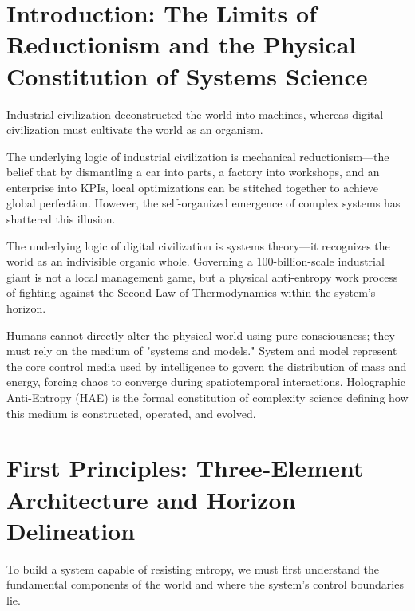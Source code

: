 \documentclass[11pt,a4paper]{article}
\begin{document}
\newpage

\section{Introduction: The Limits of Reductionism and the Physical Constitution of Systems Science}

Industrial civilization deconstructed the world into machines, whereas digital civilization must cultivate the world as an organism.

The underlying logic of industrial civilization is mechanical reductionism—the belief that by dismantling a car into parts, a factory into workshops, and an enterprise into KPIs, local optimizations can be stitched together to achieve global perfection. However, the self-organized emergence of complex systems has shattered this illusion.

The underlying logic of digital civilization is systems theory—it recognizes the world as an indivisible organic whole. Governing a 100-billion-scale industrial giant is not a local management game, but a physical anti-entropy work process of fighting against the Second Law of Thermodynamics within the system's horizon.

Humans cannot directly alter the physical world using pure consciousness; they must rely on the medium of "systems and models." System and model represent the core control media used by intelligence to govern the distribution of mass and energy, forcing chaos to converge during spatiotemporal interactions. Holographic Anti-Entropy (HAE) is the formal constitution of complexity science defining how this medium is constructed, operated, and evolved.

\section{First Principles: Three-Element Architecture and Horizon Delineation}
\label{sec:first-principles}

To build a system capable of resisting entropy, we must first understand the fundamental components of the world and where the system's control boundaries lie.
\end{document}
